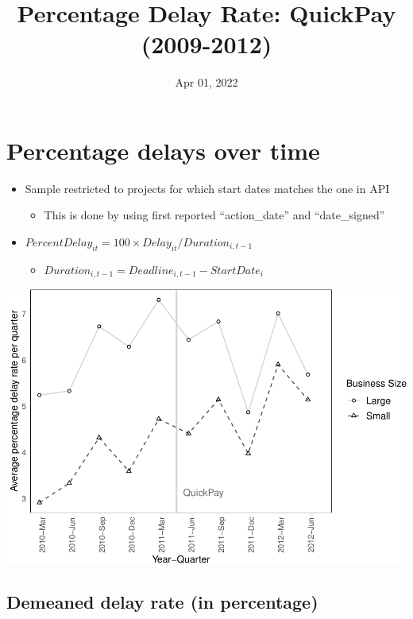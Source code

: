 \documentclass[
]{article}
\title{Percentage Delay Rate: QuickPay (2009-2012)}
\author{}
\date{\vspace{-2.5em}Apr 01, 2022}
\providecommand{\tightlist}{%
  \setlength{\itemsep}{0pt}\setlength{\parskip}{0pt}}
\begin{document}
\maketitle

\hypertarget{percentage-delays-over-time}{%
\section{Percentage delays over
time}\label{percentage-delays-over-time}}

\begin{itemize}
\tightlist
\item
  Sample restricted to projects for which start dates matches the one in
  API

  \begin{itemize}
  \tightlist
  \item
    This is done by using first reported ``action\_date'' and
    ``date\_signed''
  \end{itemize}
\item
  \(PercentDelay_{it}=100 \times Delay_{it}/Duration_{i,t-1}\)

  \begin{itemize}
  \tightlist
  \item
    \(Duration_{i,t-1} = Deadline_{i,t-1} - StartDate_i\)
  \end{itemize}
\end{itemize}

\includegraphics{qp_first_pc_delay-2_files/figure-latex/plot_pc_delay-1.pdf}

\hypertarget{demeaned-delay-rate-in-percentage}{%
\subsection{Demeaned delay rate (in
percentage)}\label{demeaned-delay-rate-in-percentage}}
\end{document}
